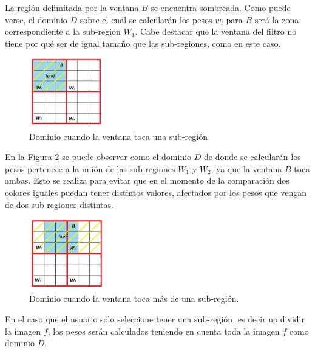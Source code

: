 

 La regi\'on delimitada por la ventana $B$ se encuentra sombreada. Como puede verse, el dominio
$D$ sobre el cual se calcular\'an los pesos $w_l$ para $B$ ser\'a la zona correspondiente a la
sub-region $W_1$. Cabe destacar que la ventana del filtro no tiene por qu\'e ser de igual
tama\~no que las sub-regiones, como en este caso.


\begin{figure}
	\centering
		\includegraphics[width=0.3\textwidth]{fig/Sub-region.jpg}
	\caption{Dominio cuando la ventana toca una sub-regi\'on}
	\label{fig:Sub-region}
\end{figure}

En la Figura \ref{fig:Sub-regiones} se puede observar como el dominio $D$ de donde se calcular\'an los pesos pertenece a la uni\'on de las sub-regiones $W_1$ y $W_2$, ya que la ventana $B$ toca ambas. Esto se realiza para evitar que en el momento de la comparaci\'on dos colores  iguales puedan tener distintos valores, afectados por los pesos que vengan de dos sub-regiones distintas.  


\begin{figure}
	\centering
		\includegraphics[width=0.3\textwidth]{fig/Sub-regiones.jpg}
	\caption{Dominio cuando la ventana toca m\'as de una sub-regi\'on.}
	\label{fig:Sub-regiones}
\end{figure} En el caso que el usuario solo seleccione tener una sub-regi\'on, es decir no dividir la imagen $f$, los pesos ser\'an calculados teniendo en cuenta toda la imagen $f$ como dominio $D$. 

